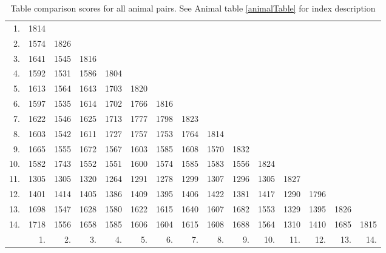 \documentclass[a4paper,11pt]{article}
\begin{document}
\begin{table}[htbp]
\footnotesize
\label{scoreTab}
\begin{center}
\begin{tabular}{r|rrrrrrrrrrrrrr}
1. & 1814 &      &      &      &      &      &      &      &      &      &      &      &      &     \\
2. & 1574 & 1826 &      &      &      &      &      &      &      &      &      &      &      &     \\
3. & 1641 & 1545 & 1816 &      &      &      &      &      &      &      &      &      &      &     \\
4. & 1592 & 1531 & 1586 & 1804 &      &      &      &      &      &      &      &      &      &     \\
5. & 1613 & 1564 & 1643 & 1703 & 1820 &      &      &      &      &      &      &      &      &     \\
6. & 1597 & 1535 & 1614 & 1702 & 1766 & 1816 &      &      &      &      &      &      &      &     \\
7. & 1622 & 1546 & 1625 & 1713 & 1777 & 1798 & 1823 &      &      &      &      &      &      &     \\
8. & 1603 & 1542 & 1611 & 1727 & 1757 & 1753 & 1764 & 1814 &      &      &      &      &      &     \\
9. & 1665 & 1555 & 1672 & 1567 & 1603 & 1585 & 1608 & 1570 & 1832 &      &      &      &      &     \\
10. & 1582 & 1743 & 1552 & 1551 & 1600 & 1574 & 1585 & 1583 & 1556 & 1824 &      &      &      &     \\
11. & 1305 & 1305 & 1320 & 1264 & 1291 & 1278 & 1299 & 1307 & 1296 & 1305 & 1827 &      &      &     \\
12. & 1401 & 1414 & 1405 & 1386 & 1409 & 1395 & 1406 & 1422 & 1381 & 1417 & 1290 & 1796 &      &     \\
13. & 1698 & 1547 & 1628 & 1580 & 1622 & 1615 & 1640 & 1607 & 1682 & 1553 & 1329 & 1395 & 1826 &     \\
14. & 1718 & 1556 & 1658 & 1585 & 1606 & 1604 & 1615 & 1608 & 1688 & 1564 & 1310 & 1410 & 1685 & 1815\\

\hline
 & 1. & 2. & 3. & 4. & 5. & 6. & 7. & 8. & 9. & 10. & 11. & 12. & 13. & 14. \\

\end{tabular}
\caption{Table comparison scores for all animal pairs. See Animal table \ref{animalTable} for index description}
\end{center}
\end{table}
\end{document}
